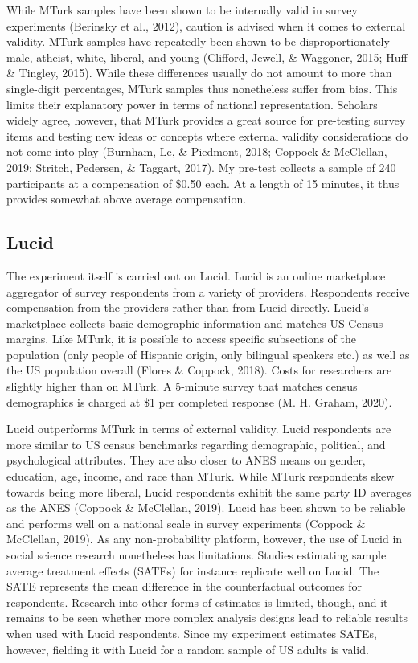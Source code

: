 \documentclass[12pt,econ]{sources/authesis}
\begin{document}
While MTurk samples have been shown to be internally valid in survey experiments (Berinsky et al., 2012), caution is advised when it comes to external validity. MTurk samples have repeatedly been shown to be disproportionately male, atheist, white, liberal, and young (Clifford, Jewell, \& Waggoner, 2015; Huff \& Tingley, 2015). While these differences usually do not amount to more than single-digit percentages, MTurk samples thus nonetheless suffer from bias. This limits their explanatory power in terms of national representation. Scholars widely agree, however, that MTurk provides a great source for pre-testing survey items and testing new ideas or concepts where external validity considerations do not come into play (Burnham, Le, \& Piedmont, 2018; Coppock \& McClellan, 2019; Stritch, Pedersen, \& Taggart, 2017). My pre-test collects a sample of 240 participants at a compensation of \$0.50 each. At a length of 15 minutes, it thus provides somewhat above average compensation.

\hypertarget{framing-data-lucid}{%
\subsection{Lucid}\label{framing-data-lucid}}

The experiment itself is carried out on Lucid. Lucid is an online marketplace aggregator of survey respondents from a variety of providers. Respondents receive compensation from the providers rather than from Lucid directly. Lucid's marketplace collects basic demographic information and matches US Census margins. Like MTurk, it is possible to access specific subsections of the population (only people of Hispanic origin, only bilingual speakers etc.) as well as the US population overall (Flores \& Coppock, 2018). Costs for researchers are slightly higher than on MTurk. A 5-minute survey that matches census demographics is charged at \$1 per completed response (M. H. Graham, 2020).

Lucid outperforms MTurk in terms of external validity. Lucid respondents are more similar to US census benchmarks regarding demographic, political, and psychological attributes. They are also closer to ANES means on gender, education, age, income, and race than MTurk. While MTurk respondents skew towards being more liberal, Lucid respondents exhibit the same party ID averages as the ANES (Coppock \& McClellan, 2019). Lucid has been shown to be reliable and performs well on a national scale in survey experiments (Coppock \& McClellan, 2019). As any non-probability platform, however, the use of Lucid in social science research nonetheless has limitations. Studies estimating sample average treatment effects (SATEs) for instance replicate well on Lucid. The SATE represents the mean difference in the counterfactual outcomes for respondents. Research into other forms of estimates is limited, though, and it remains to be seen whether more complex analysis designs lead to reliable results when used with Lucid respondents. Since my experiment estimates SATEs, however, fielding it with Lucid for a random sample of US adults is valid.
\end{document}
